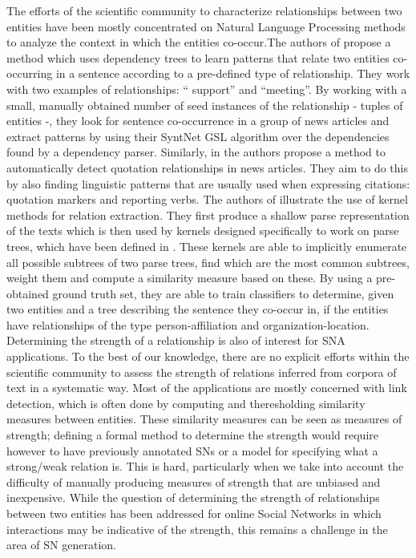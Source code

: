 The efforts of the scientific community to characterize relationships between two entities have been mostly concentrated on Natural Language Processing methods to analyze the context in which the entities co-occur.The authors of \cite{syntactic-template} propose a method which uses dependency trees to learn patterns that relate two entities co-occurring in a sentence according to a pre-defined type of relationship. They work with two examples of relationships: `` support'' and ``meeting''. By working with a small, manually obtained number of seed instances of the relationship - tuples of entities -, they look for sentence co-occurrence in a group of news articles and extract patterns by using their SyntNet GSL algorithm over the dependencies found by a dependency parser. Similarly, in \cite{news-quotation} the authors propose a method to automatically detect quotation relationships in news articles. They aim to do this by also finding linguistic patterns that are usually used when expressing citations: quotation markers and reporting verbs. The authors of \cite{kernel-relation-extraction} illustrate the use of kernel methods for relation extraction. They first produce a shallow parse representation of the texts which is then used by kernels designed specifically to work on parse trees, which have been defined in \cite{tree-kernel}. These kernels are able to implicitly enumerate all possible subtrees of two parse trees, find which are the most common subtrees, weight them and compute a similarity measure based on these. By using a pre-obtained ground truth set, they are able to train classifiers to determine, given two entities and a tree describing the sentence they co-occur in, if the entities have relationships of the type person-affiliation and organization-location.\\

Determining the strength of a relationship is also of interest for SNA applications. To the best of our knowledge, there are no explicit efforts within the scientific community to assess the strength of relations inferred from corpora of text in a systematic way. Most of the applications are mostly concerned with link detection, which is often done by computing and theresholding similarity measures between entities. These similarity measures can be seen as measures of strength; defining a formal method to determine the strength would require however to have previously annotated SNs or a model for specifying what a strong/weak relation is. This is hard, particularly when we take into account the difficulty of manually producing measures of strength that are unbiased and inexpensive. While the question of determining the strength of relationships between two entities has been addressed for online Social Networks in which interactions may be indicative of the strength\cite{xiang2010modeling}, this remains a challenge in the area of SN generation.

